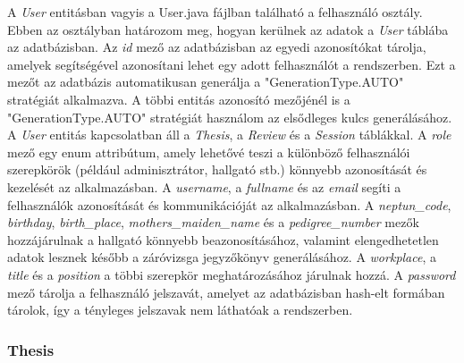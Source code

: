 A \textit{User} entitásban vagyis a User.java fájlban található a felhasználó osztály. Ebben az osztályban határozom meg, hogyan kerülnek az adatok a \textit{User} táblába az adatbázisban. Az \textit{id} mező az adatbázisban az egyedi azonosítókat tárolja, amelyek segítségével azonosítani lehet egy adott felhasználót a rendszerben. Ezt a mezőt az adatbázis automatikusan generálja a "GenerationType.AUTO" stratégiát alkalmazva. A többi entitás azonosító mezőjénél is a "GenerationType.AUTO" stratégiát használom az elsődleges kulcs generálásához. A \textit{User} entitás kapcsolatban áll a \textit{Thesis}, a \textit{Review} és a \textit{Session} táblákkal. A \textit{role} mező egy enum attribútum, amely lehetővé teszi a különböző felhasználói szerepkörök (például adminisztrátor, hallgató stb.) könnyebb azonosítását és kezelését az alkalmazásban. A \textit{username}, a \textit{fullname} és az \textit{email} segíti a felhasználók azonosítását és kommunikációját az alkalmazásban. A \textit{neptun\_code}, \textit{birthday}, \textit{birth\_place}, \textit{mothers\_maiden\_name} és a \textit{pedigree\_number} mezők hozzájárulnak a hallgató könnyebb beazonosításához, valamint elengedhetetlen adatok lesznek később a záróvizsga jegyzőkönyv generálásához. A \textit{workplace}, a \textit{title} és a \textit{position} a többi szerepkör meghatározásához járulnak hozzá. A \textit{password} mező tárolja a felhasználó jelszavát, amelyet az adatbázisban hash-elt formában tárolok, így a tényleges jelszavak nem láthatóak a rendszerben.


\subsubsection{Thesis}


